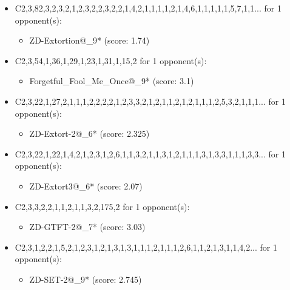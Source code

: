 \begin{appendices}
\begin{itemize}
    \item C2,3,82,3,2,3,2,1,2,3,2,2,3,2,2,1,4,2,1,1,1,1,2,1,4,6,1,1,1,1,1,5,7,1,1... for 1 opponent(s):
    \begin{multicols}{3}
         \begin{itemize}
            \item ZD-Extortion@\_9* (score: 1.74)
        \end{itemize}
     \end{multicols}
     
    \item C2,3,54,1,36,1,29,1,23,1,31,1,15,2 for 1 opponent(s):
    \begin{multicols}{3}
         \begin{itemize}
            \item Forgetful\_Fool\_Me\_Once@\_9* (score: 3.1)
        \end{itemize}
     \end{multicols}
     
    \item C2,3,22,1,27,2,1,1,1,2,2,2,2,1,2,3,3,2,1,2,1,1,2,1,2,1,1,1,2,5,3,2,1,1,1... for 1 opponent(s):
    \begin{multicols}{3}
         \begin{itemize}
            \item ZD-Extort-2@\_6* (score: 2.325)
        \end{itemize}
     \end{multicols}
     
    \item C2,3,22,1,22,1,4,2,1,2,3,1,2,6,1,1,3,2,1,1,3,1,2,1,1,1,3,1,3,3,1,1,1,3,3... for 1 opponent(s):
    \begin{multicols}{3}
         \begin{itemize}
            \item ZD-Extort3@\_6* (score: 2.07)
        \end{itemize}
     \end{multicols}
     
    \item C2,3,3,2,2,1,1,2,1,1,3,2,175,2 for 1 opponent(s):
    \begin{multicols}{3}
         \begin{itemize}
            \item ZD-GTFT-2@\_7* (score: 3.03)
        \end{itemize}
     \end{multicols}
     
    \item C2,3,1,2,2,1,5,2,1,2,3,1,2,1,3,1,3,1,1,1,2,1,1,1,2,6,1,1,2,1,3,1,1,4,2... for 1 opponent(s):
    \begin{multicols}{3}
         \begin{itemize}
            \item ZD-SET-2@\_9* (score: 2.745)
        \end{itemize}
     \end{multicols}
     

\end{itemize}
\end{appendices}
